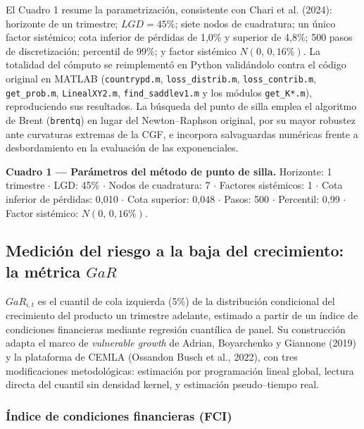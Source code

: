\documentclass[5p,times,twocolumn,authoryear]{elsarticle}
\begin{document}
El Cuadro 1 resume la parametrización, consistente con Chari et al. (2024): horizonte de un trimestre; $LGD = 45\%$; siete nodos de cuadratura; un único factor sistémico; cota inferior de pérdidas de 1,0\% y superior de 4,8\%; 500 pasos de discretización; percentil de 99\%; y factor sistémico $N(0,\,0{,}16\%)$. La totalidad del cómputo se reimplementó en Python validándolo contra el código original en MATLAB (\texttt{countrypd.m}, \texttt{loss\_distrib.m}, \texttt{loss\_contrib.m}, \texttt{get\_prob.m}, \texttt{LinealXY2.m}, \texttt{find\_saddlev1.m} y los módulos \texttt{get\_K*.m}), reproduciendo sus resultados. La búsqueda del punto de silla emplea el algoritmo de Brent (\texttt{brentq}) en lugar del Newton–Raphson original, por su mayor robustez ante curvaturas extremas de la CGF, e incorpora salvaguardas numéricas frente a desbordamiento en la evaluación de las exponenciales.

\vspace{1em}
\noindent \textbf{Cuadro 1 — Parámetros del método de punto de silla.} Horizonte: 1 trimestre $\cdot$ LGD: 45\% $\cdot$ Nodos de cuadratura: 7 $\cdot$ Factores sistémicos: 1 $\cdot$ Cota inferior de pérdidas: 0,010 $\cdot$ Cota superior: 0,048 $\cdot$ Pasos: 500 $\cdot$ Percentil: 0,99 $\cdot$ Factor sistémico: $N(0,\,0{,}16\%)$.
\vspace{1em}

\subsection{Medición del riesgo a la baja del crecimiento: la métrica $GaR$}

$GaR_{i,t}$ es el cuantil de cola izquierda (5\%) de la distribución condicional del crecimiento del producto un trimestre adelante, estimado a partir de un índice de condiciones financieras mediante regresión cuantílica de panel. Su construcción adapta el marco de \textit{vulnerable growth} de Adrian, Boyarchenko y Giannone (2019) y la plataforma de CEMLA (Ossandon Busch et al., 2022), con tres modificaciones metodológicas: estimación por programación lineal global, lectura directa del cuantil sin densidad kernel, y estimación pseudo–tiempo real.

\subsubsection{Índice de condiciones financieras (FCI)}
\end{document}
